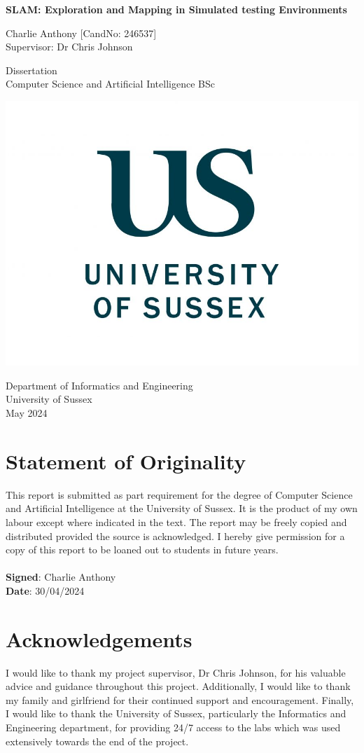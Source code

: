\documentclass[12pt]{article}
\begin{document}
\begin{titlepage}
    \centering
    \vspace*{5cm}

    \Large
    \textbf{SLAM: Exploration and Mapping in Simulated testing Environments}

    \vspace{1cm}

    Charlie Anthony [CandNo: 246537]\\
    Supervisor: Dr Chris Johnson

    \vfill

    \vspace{1cm}

    \small
    Dissertation\\
    Computer Science and Artificial Intelligence BSc

    \includegraphics[width=0.3\linewidth]{sussex_logo.jpg}

    \small
    Department of Informatics and Engineering\\
    University of Sussex\\
    May 2024
\end{titlepage}

\section*{Statement of Originality}
This report is submitted as part requirement for the degree of Computer Science and Artificial Intelligence at
the University of Sussex. It is the product of my own labour except where indicated in the text. The report may
be freely copied and distributed provided the source is acknowledged. I hereby give  permission for a copy of
this report to be loaned out to students in future years.\\ \\
\textbf{Signed}: Charlie Anthony \\
\textbf{Date}: 30/04/2024\\


\section*{Acknowledgements}
I would like to thank my project supervisor, Dr Chris Johnson, for his valuable advice and guidance throughout this project.
Additionally, I would like to thank my family and girlfriend for their continued support and encouragement. Finally,
I would like to thank the University of Sussex, particularly the Informatics and Engineering department, for providing
24/7 access to the labs which was used extensively towards the end of the project.
\end{document}
